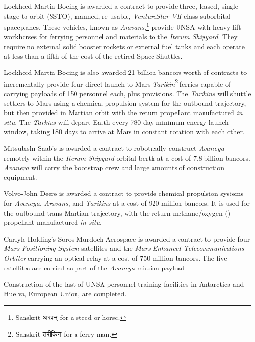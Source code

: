 Lockheed Martin-Boeing is awarded a contract to provide three, leased, single-stage-to-orbit (SSTO), manned, re-usable, {\it VentureStar VII} class suborbital spaceplanes. These vehicles, known as {\it Aravans},\footnote{Sanskrit अरवन् for a steed or horse.} provide UNSA with heavy lift workhorses for ferrying personnel and materials to the {\it Iterum Shipyard}. They require no external solid booster rockets or external fuel tanks and each operate at less than a fifth of the cost of the retired Space Shuttles.

Lockheed Martin-Boeing is also awarded 21 billion bancors worth of contracts to incrementally provide four direct-launch to Mars {\it Tarikin}\footnote{Sanskrit तरीकिन for a ferry-man.} ferries capable of carrying payloads of 150 personnel each, plus provisions. The {\it Tarikins} will shuttle settlers to Mars using a chemical  propulsion system for the outbound trajectory, but then provided in Martian orbit with the return  propellant manufactured {\it in situ}. The {\it Tarkins} will depart Earth every 780 day minimum-energy launch window, taking 180 days to arrive at Mars in constant rotation with each other.

Mitsubishi-Saab's is awarded a contract to robotically construct {\it Avaneya} remotely within the {\it Iterum Shipyard} orbital berth at a cost of 7.8 billion bancors. {\it Avaneya} will carry the bootstrap crew and large amounts of construction equipment.

Volvo-John Deere is awarded a contract to provide chemical propulsion systems for {\it Avaneya}, {\it Aravans}, and {\it Tarikins} at a cost of 920 million bancors. It is used for the outbound trans-Martian trajectory, with the return methane/oxygen () propellant manufactured {\it in situ}.

Carlyle Holding's Soros-Murdoch Aerospace is awarded a contract to provide four {\it Mars Positioning System} satellites and the {\it Mars Enhanced Telecommunications Orbiter} carrying an optical relay at a cost of 750 million bancors. The five satellites are carried as part of the {\it Avaneya} mission payload
\StopTimelineDate

Construction of the last of UNSA personnel training facilities in Antarctica and Huelva, European Union, are completed.
\StopTimelineDate

